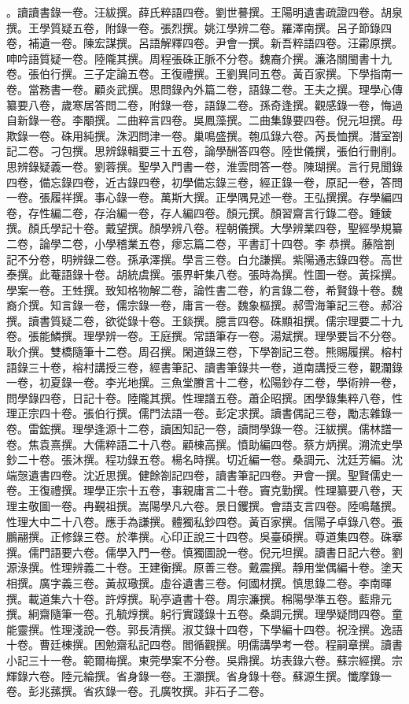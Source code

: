 \begin{pinyinscope}
。讀讀書錄一卷。汪紱撰。薛氏粹語四卷。劉世謩撰。王陽明遺書疏證四卷。胡泉撰。王學質疑五卷，附錄一卷。張烈撰。姚江學辨二卷。羅澤南撰。呂子節錄四卷，補遺一卷。陳宏謀撰。呂語解釋四卷。尹會一撰。新吾粹語四卷。汪霦原撰。呻吟語質疑一卷。陸隴其撰。周程張硃正脈不分卷。魏裔介撰。濂洛關閩書十九卷。張伯行撰。三子定論五卷。王復禮撰。王劉異同五卷。黃百家撰。下學指南一卷。當務書一卷。顧炎武撰。思問錄內外篇二卷，語錄二卷。王夫之撰。理學心傳纂要八卷，歲寒居答問二卷，附錄一卷，語錄二卷。孫奇逢撰。觀感錄一卷，悔過自新錄一卷。李顒撰。二曲粹言四卷。吳鳳藻撰。二曲集錄要四卷。倪元坦撰。毋欺錄一卷。硃用純撰。洙泗問津一卷。巢鳴盛撰。匏瓜錄六卷。芮長恤撰。潛室劄記二卷。刁包撰。思辨錄輯要三十五卷，論學酬答四卷。陸世儀撰，張伯行刪削。思辨錄疑義一卷。劉蓉撰。聖學入門書一卷，淮雲問答一卷。陳瑚撰。言行見聞錄四卷，備忘錄四卷，近古錄四卷，初學備忘錄三卷，經正錄一卷，原記一卷，答問一卷。張履祥撰。事心錄一卷。萬斯大撰。正學隅見述一卷。王弘撰撰。存學編四卷，存性編二卷，存治編一卷，存人編四卷。顏元撰。顏習齋言行錄二卷。鍾錂撰。顏氏學記十卷。戴望撰。顏學辨八卷。程朝儀撰。大學辨業四卷，聖經學規纂二卷，論學二卷，小學稽業五卷，瘳忘篇二卷，平書訂十四卷。李恭撰。藤陰劄記不分卷，明辨錄二卷。孫承澤撰。學言三卷。白允謙撰。紫陽通志錄四卷。高世泰撰。此菴語錄十卷。胡統虞撰。張界軒集八卷。張時為撰。性圖一卷。黃採撰。學案一卷。王甡撰。致知格物解二卷，論性書二卷，約言錄二卷，希賢錄十卷。魏裔介撰。知言錄一卷，儒宗錄一卷，庸言一卷。魏象樞撰。郝雪海筆記三卷。郝浴撰。讀書質疑二卷，欲從錄十卷。王錟撰。臆言四卷。硃顯祖撰。儒宗理要二十九卷。張能鱗撰。理學辨一卷。王庭撰。常語筆存一卷。湯斌撰。理學要旨不分卷。耿介撰。雙橋隨筆十二卷。周召撰。閑道錄三卷，下學劄記三卷。熊賜履撰。榕村語錄三十卷，榕村講授三卷，經書筆記、讀書筆錄共一卷，道南講授三卷，觀瀾錄一卷，初夏錄一卷。李光地撰。三魚堂賸言十二卷，松陽鈔存二卷，學術辨一卷，問學錄四卷，日記十卷。陸隴其撰。性理譜五卷。蕭企昭撰。困學錄集粹八卷，性理正宗四十卷。張伯行撰。儒門法語一卷。彭定求撰。讀書偶記三卷，勵志雜錄一卷。雷鋐撰。理學逢源十二卷，讀困知記一卷，讀問學錄一卷。汪紱撰。儒林譜一卷。焦袁熹撰。大儒粹語二十八卷。顧棟高撰。憤助編四卷。蔡方炳撰。溯流史學鈔二十卷。張沐撰。程功錄五卷。楊名時撰。切近編一卷。桑調元、沈廷芳編。沈端愨遺書四卷。沈近思撰。健餘劄記四卷，讀書筆記四卷。尹會一撰。聖賢儒史一卷。王復禮撰。理學正宗十五卷，事親庸言二十卷。竇克勤撰。性理纂要八卷，天理主敬圖一卷。冉覲祖撰。嵩陽學凡六卷。景日钁撰。會語支言四卷。陸鳴鼇撰。性理大中二十八卷。應手為謙撰。體獨私鈔四卷。黃百家撰。信陽子卓錄八卷。張鵬翮撰。正修錄三卷。於準撰。心印正說三十四卷。吳臺碩撰。尊道集四卷。硃搴撰。儒門語要六卷。儒學入門一卷。慎獨圖說一卷。倪元坦撰。讀書日記六卷。劉源淥撰。性理辨義二十卷。王建衡撰。原善三卷。戴震撰。靜用堂偶編十卷。塗天相撰。廣字義三卷。黃叔璥撰。虛谷遺書三卷。何國材撰。慎思錄二卷。李南暉撰。載道集六十卷。許焞撰。恥亭遺書十卷。周宗濂撰。棉陽學準五卷。藍鼎元撰。絅齋隨筆一卷。孔毓焞撰。躬行實踐錄十五卷。桑調元撰。理學疑問四卷。童能靈撰。性理淺說一卷。郭長清撰。淑艾錄十四卷，下學編十四卷。祝洤撰。逸語十卷。曹廷棟撰。困勉齋私記四卷。閻循觀撰。明儒講學考一卷。程嗣章撰。讀書小記三十一卷。範爾梅撰。東莞學案不分卷。吳鼎撰。坊表錄六卷。蘇宗經撰。宗輝錄六卷。陸元綸撰。省身錄一卷。王灝撰。省身錄十卷。蘇源生撰。懺摩錄一卷。彭兆蓀撰。省疚錄一卷。孔廣牧撰。非石子二卷。
\end{pinyinscope}
